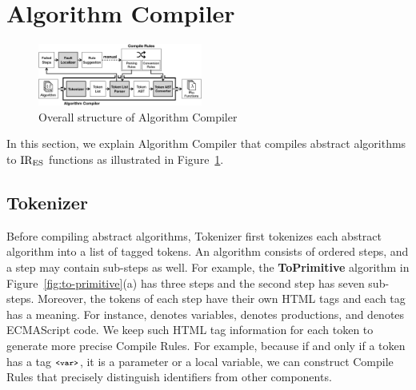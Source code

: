 \section{Algorithm Compiler}\label{sec:compiler}
\begin{figure}
  \centering
  \includegraphics[width=0.48\textwidth]{img/algo_compiler.png}
  \caption{Overall structure of {\sf Algorithm Compiler}}
  \label{fig:algo-compiler}
\end{figure}

In this section, we explain {\sf Algorithm Compiler} that compiles
abstract algorithms to \( \text{IR}_\text{ES} \) functions as illustrated in
Figure~\ref{fig:algo-compiler}.

\subsection{Tokenizer}
Before compiling abstract algorithms, {\sf Tokenizer} first tokenizes
each abstract algorithm into a list of tagged tokens.  An algorithm
consists of ordered steps, and a step may contain sub-steps as well.
For example, the \textbf{\small ToPrimitive} algorithm in
Figure~\ref{fig:to-primitive}(a) has three steps and the second step
has seven sub-steps.  Moreover, the tokens of each step have their own
HTML tags and each tag has a meaning.  For instance, 
denotes variables,  denotes productions, and
 denotes ECMAScript code.
We keep such HTML tag information for each token to generate more precise
{\sf Compile Rules}.  For example, because if and only if a token has
a tag \( \texttt{\footnotesize<var>} \), it is a parameter or a local variable, we can
construct {\sf Compile Rules} that precisely distinguish identifiers
from other components.

